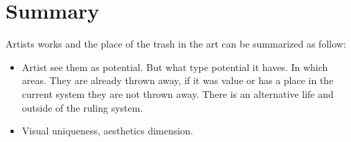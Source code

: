 \section{Summary}
Artists works and the place of the trash in the art can be summarized as follow:
\begin{itemize}
\item Artist see them as potential. But what type potential it haves. In which areas. They are already thrown away, if it was value or has a place in the current system they are not thrown away. There is an alternative life and outside of the ruling system.
\item Visual uniqueness, aesthetics dimension.
\end{itemize}








